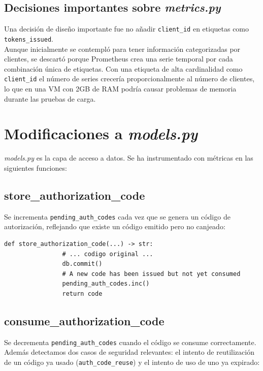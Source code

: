 \documentclass[12pt, a4paper]{article}
\begin{document}
		\subsection {Decisiones importantes sobre \textit{metrics.py}}
			Una decisión de diseño importante fue no añadir \texttt{client\_id} en etiquetas como  \texttt{tokens\_issued}.\\ Aunque inicialmente se contempló para tener información categorizadas por  clientes, se descartó porque Prometheus crea una serie temporal por cada combinación única de etiquetas. Con una etiqueta de alta cardinalidad como \texttt{client\_id} el número de series crecería proporcionalmente al número de clientes, lo que en una VM con 2GB de RAM podría causar problemas de memoria durante las pruebas de carga.

\newpage
\section{Modificaciones a \textit{models.py}}
		\textit{models.py} es la capa de acceso a datos. Se ha instrumentado con métricas en las siguientes funciones:
		
		\subsection{store\_authorization\_code}
		
			Se incrementa \texttt{pending\_auth\_codes} cada vez que se genera un código
			de autorización, reflejando que existe un código emitido pero no canjeado:
			
			\begin{lstlisting}[style=python, caption=Instrumentación de store\_authorization\_code]
				def store_authorization_code(...) -> str:
				# ... codigo original ...
				db.commit()
				# A new code has been issued but not yet consumed
				pending_auth_codes.inc()
				return code
			\end{lstlisting}
		
		\subsection{consume\_authorization\_code}
		
			Se decrementa \texttt{pending\_auth\_codes} cuando el código se consume correctamente. Además detectamos dos casos de seguridad relevantes: el intento de reutilización de un código ya usado (\texttt{auth\_code\_reuse}) y el intento de uso de uno ya  expirado:
			
\end{document}
